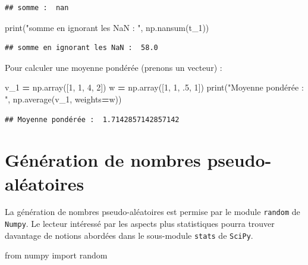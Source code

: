 \documentclass[
  12pt,
]{book}
\newenvironment{Shaded}{\begin{snugshade}}{\end{snugshade}}
\newcommand{\BuiltInTok}[1]{#1}
\newcommand{\DecValTok}[1]{\textcolor[rgb]{0.00,0.00,0.81}{#1}}
\newcommand{\FloatTok}[1]{\textcolor[rgb]{0.00,0.00,0.81}{#1}}
\newcommand{\ImportTok}[1]{#1}
\newcommand{\NormalTok}[1]{#1}
\newcommand{\OperatorTok}[1]{\textcolor[rgb]{0.81,0.36,0.00}{\textbf{#1}}}
\newcommand{\StringTok}[1]{\textcolor[rgb]{0.31,0.60,0.02}{#1}}
\numberwithin{equation}{section}
\numberwithin{countremarque}{section}
\begin{document}
\begin{lstlisting}
## somme :  nan
\end{lstlisting}

\begin{Shaded}
\begin{Highlighting}[]
\BuiltInTok{print}\NormalTok{(}\StringTok{"somme en ignorant les NaN : "}\NormalTok{, np.nansum(t\_1))}
\end{Highlighting}
\end{Shaded}

\begin{lstlisting}
## somme en ignorant les NaN :  58.0
\end{lstlisting}

Pour calculer une moyenne pondérée (prenons un vecteur) :

\begin{Shaded}
\begin{Highlighting}[]
\NormalTok{v\_1 }\OperatorTok{=}\NormalTok{ np.array([}\DecValTok{1}\NormalTok{, }\DecValTok{1}\NormalTok{, }\DecValTok{4}\NormalTok{, }\DecValTok{2}\NormalTok{])}
\NormalTok{w }\OperatorTok{=}\NormalTok{ np.array([}\DecValTok{1}\NormalTok{, }\DecValTok{1}\NormalTok{, }\FloatTok{.5}\NormalTok{, }\DecValTok{1}\NormalTok{])}
\BuiltInTok{print}\NormalTok{(}\StringTok{"Moyenne pondérée : "}\NormalTok{, np.average(v\_1, weights}\OperatorTok{=}\NormalTok{w))}
\end{Highlighting}
\end{Shaded}

\begin{lstlisting}
## Moyenne pondérée :  1.7142857142857142
\end{lstlisting}

\section{Génération de nombres pseudo-aléatoires}\label{guxe9nuxe9ration-de-nombres-pseudo-aluxe9atoires}

La génération de nombres pseudo-aléatoires est permise par le module \texttt{random} de \texttt{Numpy}. Le lecteur intéressé par les aspects plus statistiques pourra trouver davantage de notions abordées dans le sous-module \texttt{stats} de \texttt{SciPy}.

\begin{Shaded}
\begin{Highlighting}[]
\ImportTok{from}\NormalTok{ numpy }\ImportTok{import}\NormalTok{ random}
\end{Highlighting}
\end{Shaded}
\end{document}
